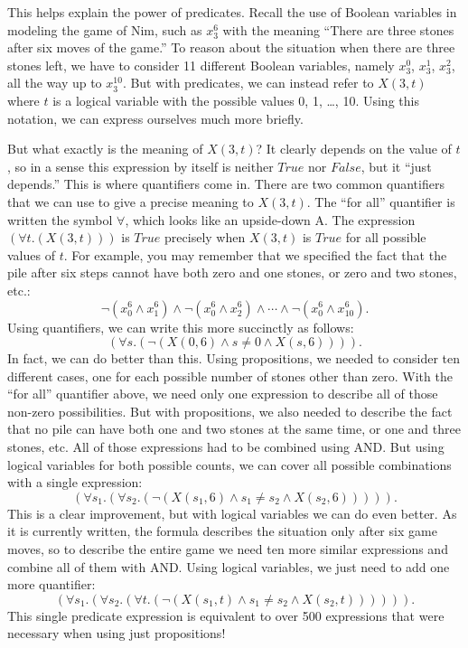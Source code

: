 {{This helps explain the power of predicates. Recall the use of Boolean variables in modeling the game of Nim, such as $x_{3}^{6}$
with the meaning ``There are three stones after six moves of the game.'' To reason about the situation when there are three
stones left, we have to consider 11 different Boolean variables, namely $x_{3}^{0}$, $x_{3}^{1}$, $x_{3}^{2}$, all the way 
up to $x_{3}^{10}$. But with predicates, we can instead refer to $X(3, t)$ where $t$ is a logical variable with the possible
values 0, 1, \dots, 10. Using this notation, we can express ourselves much more briefly.

But what exactly is the meaning of $X(3, t)$? It clearly depends on the value of $t$, so in a sense this expression by
itself is neither $True$ nor $False$, but it ``just depends.'' This is where quantifiers come in. There are two common
quantifiers that we can use to give a precise meaning to $X(3, t)$. The ``for all'' quantifier is written the symbol
$\forall$, which looks like an upside-down A. The expression $(\forall t.(X(3, t)))$ is $True$ precisely when $X(3, t)$
is $True$ for all possible values of $t$. 
For example, you may remember that we specified the fact that the pile after six steps
cannot have both zero and one stones, or zero and two stones, etc.:
$$\neg(x_{0}^{6} \wedge x_{1}^{6}) \wedge \neg(x_{0}^{6} \wedge x_{2}^{6}) \wedge \cdots \wedge \neg(x_{0}^{6} \wedge x_{10}^{6}).$$
Using quantifiers, we can write this more succinctly as follows:
$$(\forall s.(\neg(X(0, 6) \wedge s\ne0 \wedge X(s, 6)))).$$
In fact, we can do better than this. Using propositions, we needed to consider ten
different cases, one for each possible number of stones other than zero. With the 
``for all'' quantifier above, we need only one expression to describe all of those 
non-zero possibilities. But with propositions, we also needed to describe the fact
that no pile can have both one and two stones at the same time, or one and three
stones, etc.  All of those expressions had to be combined using AND. But using
logical variables for both possible counts, we can cover all possible combinations 
with a single expression:
$$(\forall s_1.(\forall s_2.(\neg(X(s_1, 6) \wedge s_1 \ne s_2 \wedge X(s_2, 6))))).$$
This is a clear improvement, but with logical variables we can do even better. As it
is currently written, the formula describes the situation only after six game moves,
so to describe the entire game we need ten more similar expressions and combine all
of them with AND. Using logical variables, we just need to add one more quantifier:
$$(\forall s_1.(\forall s_2.(\forall t.(\neg(X(s_1, t) \wedge s_1 \ne s_2 \wedge X(s_2, t)))))).$$
This single predicate expression is equivalent to over 500 expressions that were
necessary when using just propositions!

}}
